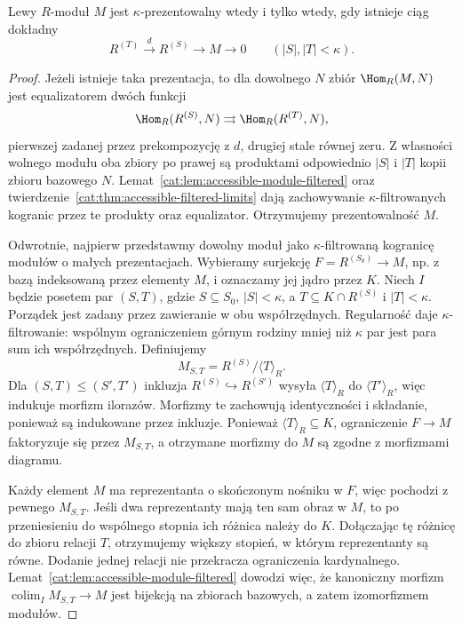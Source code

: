 \begin{twierdzenie}\label{cat:thm:accessible-module-presentability}
Lewy $R$-moduł $M$ jest $\kappa$-prezentowalny wtedy i tylko wtedy, gdy istnieje ciąg dokładny
\[
 R^{(T)}\xrightarrow{d}R^{(S)}\longrightarrow M\longrightarrow0
 \qquad(|S|,|T|<\kappa).
\]
\end{twierdzenie}
\begin{proof}
Jeżeli istnieje taka prezentacja, to dla dowolnego $N$ zbiór $\Hom_R(M,N)$ jest equalizatorem dwóch funkcji
\[
 \Hom_R(R^{(S)},N)\rightrightarrows\Hom_R(R^{(T)},N),
\]
pierwszej zadanej przez prekompozycję z $d$, drugiej stale równej zeru. Z własności wolnego modułu oba zbiory po prawej są produktami odpowiednio $|S|$ i $|T|$ kopii zbioru bazowego $N$. Lemat~\ref{cat:lem:accessible-module-filtered} oraz twierdzenie~\ref{cat:thm:accessible-filtered-limits} dają zachowywanie $\kappa$-filtrowanych kogranic przez te produkty oraz equalizator. Otrzymujemy prezentowalność $M$.

Odwrotnie, najpierw przedstawmy dowolny moduł jako $\kappa$-filtrowaną kogranicę modułów o małych prezentacjach. Wybieramy surjekcję $F=R^{(S_0)}\to M$, np. z bazą indeksowaną przez elementy $M$, i oznaczamy jej jądro przez $K$. Niech $I$ będzie posetem par $(S,T)$, gdzie $S\subseteq S_0$, $|S|<\kappa$, a $T\subseteq K\cap R^{(S)}$ i $|T|<\kappa$. Porządek jest zadany przez zawieranie w obu współrzędnych. Regularność daje $\kappa$-filtrowanie: wspólnym ograniczeniem górnym rodziny mniej niż $\kappa$ par jest para sum ich współrzędnych. Definiujemy
\[
 M_{S,T}=R^{(S)}/\langle T\rangle_R .
\]
Dla $(S,T)\leq(S',T')$ inkluzja $R^{(S)}\hookrightarrow R^{(S')}$ wysyła $\langle T\rangle_R$ do $\langle T'\rangle_R$, więc indukuje morfizm ilorazów. Morfizmy te zachowują identyczności i składanie, ponieważ są indukowane przez inkluzje. Ponieważ $\langle T\rangle_R\subseteq K$, ograniczenie $F\to M$ faktoryzuje się przez $M_{S,T}$, a otrzymane morfizmy do $M$ są zgodne z morfizmami diagramu.

Każdy element $M$ ma reprezentanta o skończonym nośniku w $F$, więc pochodzi z pewnego $M_{S,T}$. Jeśli dwa reprezentanty mają ten sam obraz w $M$, to po przeniesieniu do wspólnego stopnia ich różnica należy do $K$. Dołączając tę różnicę do zbioru relacji $T$, otrzymujemy większy stopień, w którym reprezentanty są równe. Dodanie jednej relacji nie przekracza ograniczenia kardynalnego. Lemat~\ref{cat:lem:accessible-module-filtered} dowodzi więc, że kanoniczny morfizm $\operatorname{colim}_I M_{S,T}\to M$ jest bijekcją na zbiorach bazowych, a zatem izomorfizmem modułów.


\end{proof}

